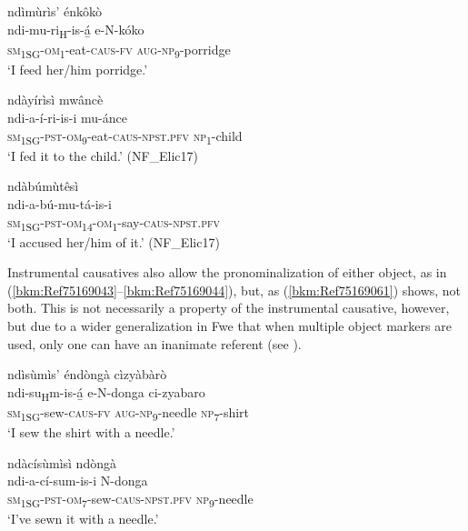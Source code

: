 \ea
\label{bkm:Ref75164990}
ndìmùrìs’ énkôkò\\
\gll ndi-mu-ri\textsubscript{H}-is-á̲    e-N-kóko\\
\textsc{sm}\textsubscript{1SG}-\textsc{om}\textsubscript{1}-eat-\textsc{caus}-\textsc{fv}  \textsc{aug}-\textsc{np}\textsubscript{9}-porridge\\
\glt ‘I feed her/him porridge.’
\z

\ea
\label{bkm:Ref75164992}
ndàyírìsì mwâncè\\
\gll ndi-a-í-ri-is-i        mu-ánce\\
\textsc{sm}\textsubscript{1SG}-\textsc{pst}-\textsc{om}\textsubscript{9}-eat-\textsc{caus}-\textsc{npst}.\textsc{pfv}  \textsc{np}\textsubscript{1}-child\\
\glt ‘I fed it to the child.’ (NF\_Elic17)
\z

\ea
\label{bkm:Ref488916066}
\glll ndàbúmùtêsì\\
ndi-a-bú-mu-tá-is-i\\
\textsc{sm}\textsubscript{1SG}-\textsc{pst}-\textsc{om}\textsubscript{14}-\textsc{om}\textsubscript{1}-say-\textsc{caus}-\textsc{npst}.\textsc{pfv}\\
\glt ‘I accused her/him of it.’ (NF\_Elic17)
\z

Instrumental causatives also allow the pronominalization of either object, as in (\ref{bkm:Ref75169043}--\ref{bkm:Ref75169044}), but, as (\ref{bkm:Ref75169061}) shows, not both. This is not necessarily a property of the instrumental causative, however, but due to a wider generalization in Fwe that when multiple object markers are used, only one can have an inanimate referent (see ).

\ea
ndìsùmìs’ éndòngà cìzyàbàrò\\
\gll ndi-su\textsubscript{H}m-is-á̲  e-N-donga    ci-zyabaro\\
\textsc{sm}\textsubscript{1SG}-sew-\textsc{caus}-\textsc{fv}  \textsc{aug}-\textsc{np}\textsubscript{9}-needle  \textsc{np}\textsubscript{7}-shirt\\
\glt ‘I sew the shirt with a needle.’
\z

\ea
\label{bkm:Ref75169043}
ndàcísùmìsì ndòngà\\
\gll ndi-a-cí-sum-is-i        N-donga\\
\textsc{sm}\textsubscript{1SG}-\textsc{pst}-\textsc{om}\textsubscript{7}-sew-\textsc{caus}-\textsc{npst}.\textsc{pfv}  \textsc{np}\textsubscript{9}-needle\\
\glt ‘I’ve sewn it with a needle.’
\z

